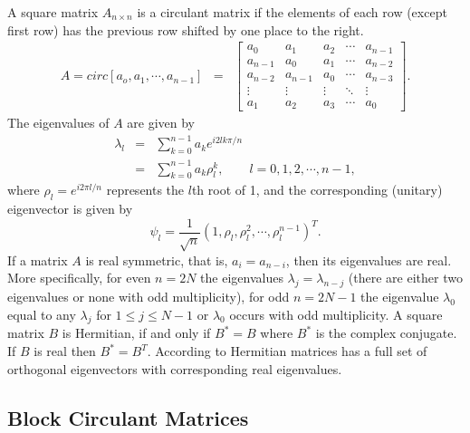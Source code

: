 A square matrix $A_{n\times n}$ is a circulant matrix if the elements of each row (except first row) has the previous row shifted by one place to the right.
\begin{eqnarray}
	A = circ[a_o, a_1,\cdots,a_{n-1}] &=& \left[
		\begin{array}{lllll}
			a_0     & a_1     & a_2    & \cdots & a_{n-1} \\
			a_{n-1} & a_0     & a_1    & \cdots & a_{n-2} \\
			a_{n-2} & a_{n-1} & a_0    & \cdots & a_{n-3} \\
			\vdots  & \vdots  & \vdots & \ddots & \vdots  \\
			a_1     & a_2     & a_3    & \cdots & a_0
		\end{array}
	\right].
\end{eqnarray}
The eigenvalues of $A$ are given by
\begin{eqnarray*}
	\lambda_l & = & \sum_{k=0}^{n-1} a_k e^{i2lk\pi/n} \\
	& = & \sum_{k=0}^{n-1}a_k \rho_l^k, \quad \quad l = 0, 1, 2, \cdots, n-1,
\end{eqnarray*}
where $\rho_l = e^{i2\pi l/n}$ represents the $l$th root of 1, and the corresponding (unitary) eigenvector is given by
\[
	\psi_l = \frac{1}{\sqrt{n}}(1, \rho_l, \rho_l^2, \cdots, \rho_l^{n-1})^T.
\]
If a matrix $A$ is real symmetric, that is, $a_i = a_{n-i}$, then its eigenvalues are real. More specifically, for even $n=2N$ the eigenvalues $\lambda_j = \lambda_{n-j}$ (there are either two eigenvalues or none with odd multiplicity), for odd $n=2N-1$ the eigenvalue $\lambda_0$ equal to any $\lambda_j$ for $1\le j \le N-1$ or $\lambda_0$ occurs with odd multiplicity. A square matrix $B$ is Hermitian, if and only if $B^* = B$ where $B^*$ is the complex conjugate. If $B$ is real then $B^* = B^T$. According to \cite{Tee2005} Hermitian matrices has a full set of orthogonal eigenvectors with corresponding real eigenvalues.


\subsection{Block Circulant Matrices}

